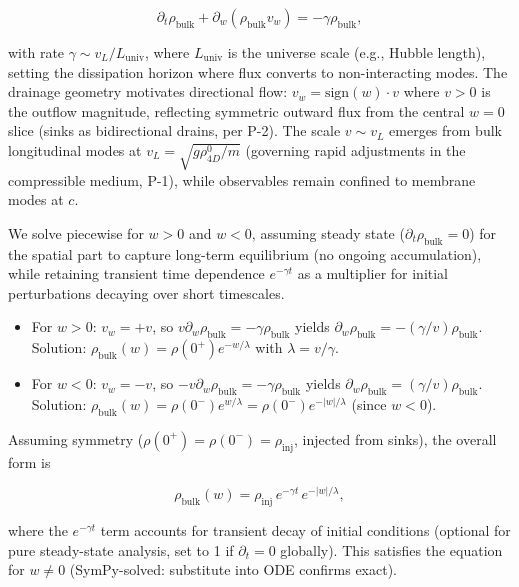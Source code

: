 \begin{equation}
\partial_t \rho_{\text{bulk}} + \partial_w (\rho_{\text{bulk}} v_w) = -\gamma \rho_{\text{bulk}},
\end{equation}

with rate $\gamma \sim v_L / L_{\text{univ}}$, where $L_{\text{univ}}$ is the universe scale (e.g., Hubble length), setting the dissipation horizon where flux converts to non-interacting modes. The drainage geometry motivates directional flow: $v_w = \text{sign}(w) \cdot v$ where $v > 0$ is the outflow magnitude, reflecting symmetric outward flux from the central $w=0$ slice (sinks as bidirectional drains, per P-2). The scale $v \sim v_L$ emerges from bulk longitudinal modes at $v_L = \sqrt{g \rho_{4D}^0 / m}$ (governing rapid adjustments in the compressible medium, P-1), while observables remain confined to membrane modes at $c$.

We solve piecewise for $w > 0$ and $w < 0$, assuming steady state ($\partial_t \rho_{\text{bulk}} = 0$) for the spatial part to capture long-term equilibrium (no ongoing accumulation), while retaining transient time dependence $e^{-\gamma t}$ as a multiplier for initial perturbations decaying over short timescales.

\begin{itemize}
\item For $w > 0$: $v_w = +v$, so $v \partial_w \rho_{\text{bulk}} = -\gamma \rho_{\text{bulk}}$ yields $\partial_w \rho_{\text{bulk}} = -(\gamma / v) \rho_{\text{bulk}}$. Solution: $\rho_{\text{bulk}}(w) = \rho(0^+) e^{-w / \lambda}$ with $\lambda = v / \gamma$.
\item For $w < 0$: $v_w = -v$, so $-v \partial_w \rho_{\text{bulk}} = -\gamma \rho_{\text{bulk}}$ yields $\partial_w \rho_{\text{bulk}} = (\gamma / v) \rho_{\text{bulk}}$. Solution: $\rho_{\text{bulk}}(w) = \rho(0^-) e^{w / \lambda} = \rho(0^-) e^{-|w| / \lambda}$ (since $w < 0$).
\end{itemize}

Assuming symmetry ($\rho(0^+) = \rho(0^-) = \rho_{\text{inj}}$, injected from sinks), the overall form is

\begin{equation}
\rho_{\text{bulk}}(w) = \rho_{\text{inj}} \, e^{-\gamma t} \, e^{-|w| / \lambda},
\end{equation}

where the $e^{-\gamma t}$ term accounts for transient decay of initial conditions (optional for pure steady-state analysis, set to 1 if $\partial_t = 0$ globally). This satisfies the equation for $w \neq 0$ (SymPy-solved: substitute into ODE confirms exact).

